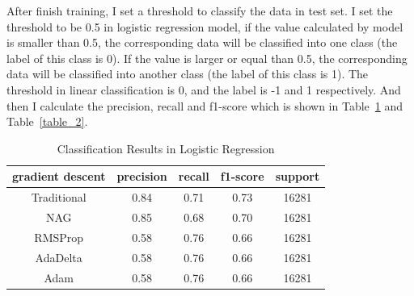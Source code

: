 \documentclass[journal, a4paper]{IEEEtran}
\begin{document}
After finish training, I set a threshold to classify the data in test set. I set the threshold to be 0.5 in logistic regression model, if the value calculated by model is smaller than 0.5, the corresponding data will be classified into one class (the label of this class is 0). If the value is larger or equal than 0.5, the corresponding data will be classified into another class (the label of this class is 1). The threshold in linear classification is 0, and the label is -1 and 1 respectively. And then I calculate the precision, recall and f1-score which is shown in Table~\ref{table_1} and Table~\ref{table_2}.

    \begin{table}[!hbt]
		\begin{center}
		\caption{Classification Results in Logistic Regression}
		\label{table_1}
		\begin{tabular}{|c|c|c|c|c|}
			\hline
			gradient descent  & precision & recall & f1-score & support \\
			\hline
			Traditional & 0.84 & 0.71 & 0.73  & 16281 \\
			\hline
			NAG & 0.85 & 0.68 & 0.70  & 16281 \\
			\hline
			RMSProp & 0.58 & 0.76 & 0.66 & 16281 \\
			\hline
            AdaDelta & 0.58 & 0.76 & 0.66 & 16281 \\
			\hline
            Adam & 0.58 & 0.76 & 0.66 & 16281 \\
			\hline
		\end{tabular}
		\end{center}
	\end{table}
\end{document}
